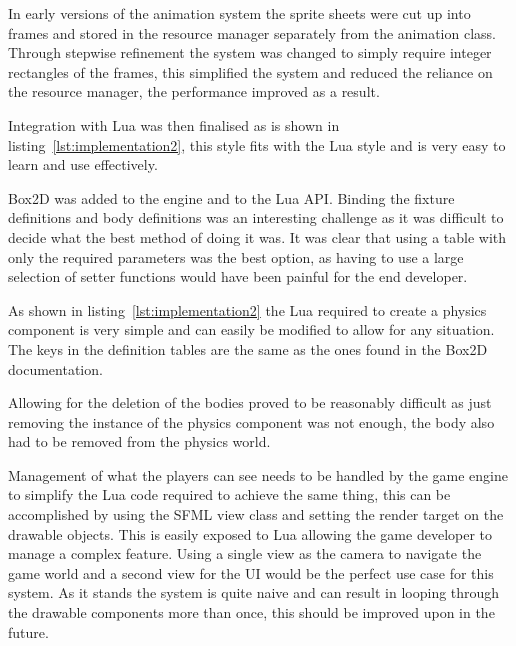 \documentclass[11pt,a4paper,titlepage]{report}
\begin{document}
	In early versions of the animation system the sprite sheets were cut up into frames and stored in the resource manager separately from the animation class. Through stepwise refinement the system was changed to simply require integer rectangles of the frames, this simplified the system and reduced the reliance on the resource manager, the performance improved as a result.

	\singlespacing
	
	\onehalfspacing

	Integration with Lua was then finalised as is shown in listing~\ref{lst:implementation2}, this style fits with the Lua style and is very easy to learn and use effectively.


	Box2D was added to the engine and to the Lua API. Binding the fixture definitions and body definitions was an interesting challenge as it was difficult to decide what the best method of doing it was. It was clear that using a table with only the required parameters was the best option, as having to use a large selection of setter functions would have been painful for the end developer.

	\singlespacing
	
	\onehalfspacing

	As shown in listing~\ref{lst:implementation2} the Lua required to create a physics component is very simple and can easily be modified to allow for any situation. The keys in the definition tables are the same as the ones found in the Box2D documentation.
	
	Allowing for the deletion of the bodies proved to be reasonably difficult as just removing the instance of the physics component was not enough, the body also had to be removed from the physics world. 


    Management of what the players can see needs to be handled by the game engine to simplify the Lua code required to achieve the same thing, this can be accomplished by using the SFML view class and setting the render target on the drawable objects. This is easily exposed to Lua allowing the game developer to manage a complex feature. Using a single view as the camera to navigate the game world and a second view for the UI would be the perfect use case for this system. As it stands the system is quite naive and can result in looping through the drawable components more than once, this should be improved upon in the future.
\end{document}
